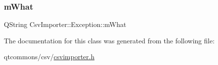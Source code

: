 \subsubsection{\texorpdfstring{mWhat}{mWhat}}
{\footnotesize\ttfamily Q\+String Csv\+Importer\+::\+Exception\+::m\+What\hspace{0.3cm}{\ttfamily [protected]}}



The documentation for this class was generated from the following file\+:\begin{DoxyCompactItemize}
\item 
qtcommons/csv/\mbox{\hyperlink{csvimporter_8h}{csvimporter.\+h}}\end{DoxyCompactItemize}
